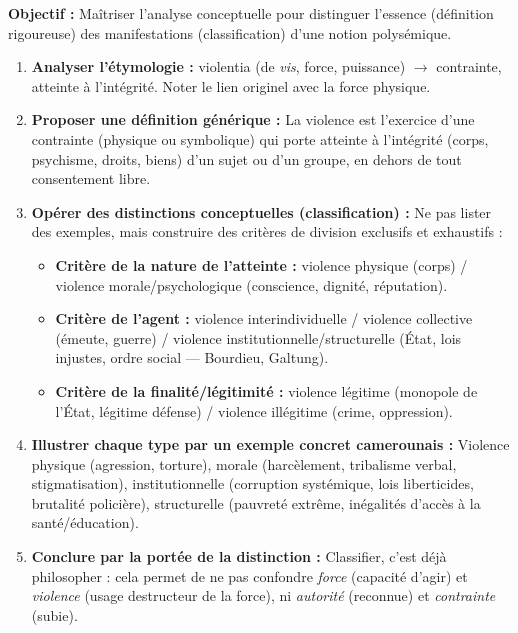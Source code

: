 \documentclass[11pt]{article}
\newcommand{\cle}[1]{{\popxbold\color{popdark}#1}}
\begin{document}
\begin{methode}
\textbf{Objectif :} Maîtriser l'analyse conceptuelle pour distinguer l'essence (définition rigoureuse) des manifestations (classification) d'une notion polysémique.
\begin{enumerate}
    \item \textbf{Analyser l'étymologie :} \cle{violentia} (de \emph{vis}, force, puissance) $\rightarrow$ contrainte, atteinte à l'intégrité. Noter le lien originel avec la \cle{force} physique.
    \item \textbf{Proposer une définition générique :} La violence est l'exercice d'une contrainte (physique ou symbolique) qui porte atteinte à l'intégrité (corps, psychisme, droits, biens) d'un sujet ou d'un groupe, en dehors de tout consentement libre.
    \item \textbf{Opérer des distinctions conceptuelles (classification) :} Ne pas lister des exemples, mais construire des \cle{critères de division} exclusifs et exhaustifs :
        \begin{itemize}
            \item \textbf{Critère de la nature de l'atteinte :} \cle{violence physique} (corps) / \cle{violence morale/psychologique} (conscience, dignité, réputation).
            \item \textbf{Critère de l'agent :} \cle{violence interindividuelle} / \cle{violence collective} (émeute, guerre) / \cle{violence institutionnelle/structurelle} (État, lois injustes, ordre social — Bourdieu, Galtung).
            \item \textbf{Critère de la finalité/légitimité :} \cle{violence légitime} (monopole de l'État, légitime défense) / \cle{violence illégitime} (crime, oppression).
        \end{itemize}
    \item \textbf{Illustrer chaque type par un exemple concret camerounais :} Violence physique (agression, torture), morale (harcèlement, tribalisme verbal, stigmatisation), institutionnelle (corruption systémique, lois liberticides, brutalité policière), structurelle (pauvreté extrême, inégalités d'accès à la santé/éducation).
    \item \textbf{Conclure par la portée de la distinction :} Classifier, c'est déjà philosopher : cela permet de ne pas confondre \emph{force} (capacité d'agir) et \emph{violence} (usage destructeur de la force), ni \emph{autorité} (reconnue) et \emph{contrainte} (subie).
\end{enumerate}
\end{methode}
\end{document}
